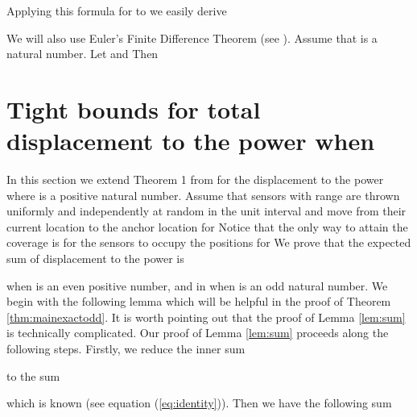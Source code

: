 \documentclass[final,5p,times,twocolumn]{elsarticle_mod}
\begin{document}
Applying this formula for  to  we easily derive

We will also use Euler's Finite Difference Theorem (see \cite[identity 10.1]{Gould}).
Assume that  is a natural number. Let  and   Then

\section{Tight bounds for total displacement to the power  when }
\label{tight:sec}
In this section we extend Theorem 1 from \cite{spa_2013} for the displacement
to the power  where  is a positive natural number.  Assume that  sensors with range  are thrown uniformly and independently at random in the unit interval
and move from their current location to the anchor location  for 
Notice that the only way to attain the coverage is for the sensors to occupy the positions  for 
We prove that the expected sum of displacement to the power  is 

when  is an even positive number,
and in  when  is an odd natural number.
We begin with the following lemma which will be helpful in the proof of Theorem \ref{thm:mainexactodd}.
It is worth pointing out that the proof of Lemma \ref{lem:sum} is technically complicated.
Our proof of Lemma \ref{lem:sum} proceeds along
the following steps.
Firstly, we  reduce the inner sum  

to the sum 

which is known (see equation (\ref{eq:identity})).
Then we have the following sum
\end{document}
